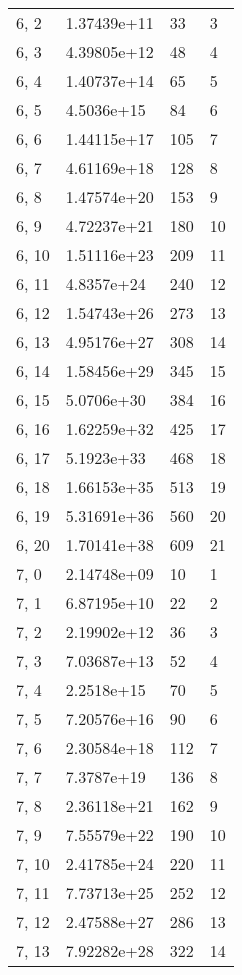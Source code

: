 \begin{table}
\begin{tabular}{llll}
6, 2   &  1.37439e+11 &   33 &     3 \\
6, 3   &  4.39805e+12 &   48 &     4 \\
6, 4   &  1.40737e+14 &   65 &     5 \\
6, 5   &   4.5036e+15 &   84 &     6 \\
6, 6   &  1.44115e+17 &  105 &     7 \\
6, 7   &  4.61169e+18 &  128 &     8 \\
6, 8   &  1.47574e+20 &  153 &     9 \\
6, 9   &  4.72237e+21 &  180 &    10 \\
6, 10  &  1.51116e+23 &  209 &    11 \\
6, 11  &   4.8357e+24 &  240 &    12 \\
6, 12  &  1.54743e+26 &  273 &    13 \\
6, 13  &  4.95176e+27 &  308 &    14 \\
6, 14  &  1.58456e+29 &  345 &    15 \\
6, 15  &   5.0706e+30 &  384 &    16 \\
6, 16  &  1.62259e+32 &  425 &    17 \\
6, 17  &   5.1923e+33 &  468 &    18 \\
6, 18  &  1.66153e+35 &  513 &    19 \\
6, 19  &  5.31691e+36 &  560 &    20 \\
6, 20  &  1.70141e+38 &  609 &    21 \\
7, 0   &  2.14748e+09 &   10 &     1 \\
7, 1   &  6.87195e+10 &   22 &     2 \\
7, 2   &  2.19902e+12 &   36 &     3 \\
7, 3   &  7.03687e+13 &   52 &     4 \\
7, 4   &   2.2518e+15 &   70 &     5 \\
7, 5   &  7.20576e+16 &   90 &     6 \\
7, 6   &  2.30584e+18 &  112 &     7 \\
7, 7   &   7.3787e+19 &  136 &     8 \\
7, 8   &  2.36118e+21 &  162 &     9 \\
7, 9   &  7.55579e+22 &  190 &    10 \\
7, 10  &  2.41785e+24 &  220 &    11 \\
7, 11  &  7.73713e+25 &  252 &    12 \\
7, 12  &  2.47588e+27 &  286 &    13 \\
7, 13  &  7.92282e+28 &  322 &    14 \\

\end{tabular}
\end{table}
